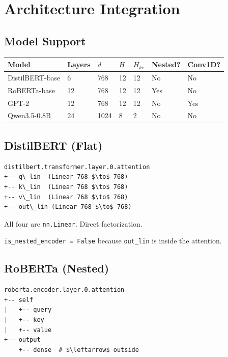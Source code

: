 
\section{Architecture Integration}

\subsection{Model Support}

\begin{table}[H]
\centering
\small
\begin{tabular}{lllllll}
\toprule
\textbf{Model} & \textbf{Layers} & \textbf{$d$} & \textbf{$H$} & \textbf{$H_{kv}$} & \textbf{Nested?} & \textbf{Conv1D?} \\
\midrule
DistilBERT-base & 6 & 768 & 12 & 12 & No & No \\
RoBERTa-base & 12 & 768 & 12 & 12 & Yes & No \\
GPT-2 & 12 & 768 & 12 & 12 & No & Yes \\
Qwen3.5-0.8B & 24 & 1024 & 8 & 2 & No & No \\
\bottomrule
\end{tabular}
\end{table}

\subsection{DistilBERT (Flat)}

\begin{lstlisting}
distilbert.transformer.layer.0.attention
+-- q\_lin  (Linear 768 $\to$ 768)
+-- k\_lin  (Linear 768 $\to$ 768)
+-- v\_lin  (Linear 768 $\to$ 768)
+-- out\_lin (Linear 768 $\to$ 768)
\end{lstlisting}

All four are \texttt{nn.Linear}. Direct factorization.

\texttt{is\_nested\_encoder = False} because \texttt{out\_lin} is inside the attention.

\subsection{RoBERTa (Nested)}

\begin{lstlisting}
roberta.encoder.layer.0.attention
+-- self
|   +-- query
|   +-- key
|   +-- value
+-- output
    +-- dense  # $\leftarrow$ outside
\end{lstlisting}

